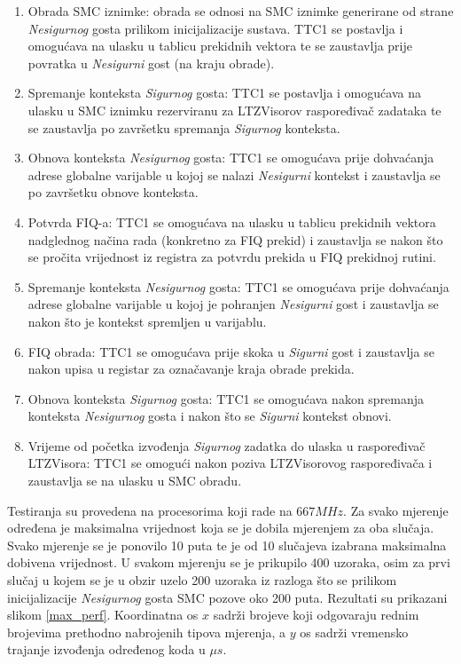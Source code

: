 \documentclass[times, utf8, diplomski, numeric]{fer}
\begin{document}
\begin{enumerate}
  \item{Obrada SMC iznimke: obrada se odnosi na SMC iznimke generirane od strane \textit{Nesigurnog} gosta prilikom
  inicijalizacije sustava. TTC1 se postavlja i omogućava na ulasku u tablicu prekidnih vektora te se zaustavlja prije
  povratka u \textit{Nesigurni} gost (na kraju obrade).}
  \item{Spremanje konteksta \textit{Sigurnog} gosta: TTC1 se postavlja i omogućava na ulasku u SMC iznimku rezerviranu
  za LTZVisorov raspoređivač zadataka te se zaustavlja po završetku spremanja \textit{Sigurnog} konteksta.}
  \item{Obnova konteksta \textit{Nesigurnog} gosta: TTC1 se omogućava prije dohvaćanja adrese globalne varijable u kojoj
  se nalazi \textit{Nesigurni} kontekst i zaustavlja se po završetku obnove konteksta.}
  \item{Potvrda FIQ-a: TTC1 se omogućava na ulasku u tablicu prekidnih vektora nadglednog načina rada (konkretno za
  FIQ prekid) i zaustavlja se nakon što se pročita vrijednost iz registra za potvrdu prekida u FIQ prekidnoj rutini.}
  \item{Spremanje konteksta \textit{Nesigurnog} gosta: TTC1 se omogućava prije dohvaćanja adrese globalne varijable u kojoj
  je pohranjen \textit{Nesigurni} gost i zaustavlja se nakon što je kontekst spremljen u varijablu.}
  \item{FIQ obrada: TTC1 se omogućava prije skoka u \textit{Sigurni} gost i zaustavlja se nakon upisa u registar za
  označavanje kraja obrade prekida.}
  \item{Obnova konteksta \textit{Sigurnog} gosta: TTC1 se omogućava nakon spremanja konteksta \textit{Nesigurnog} gosta
  i nakon što se \textit{Sigurni} kontekst obnovi.}
  \item{Vrijeme od početka izvođenja \textit{Sigurnog} zadatka do ulaska u raspoređivač LTZVisora: TTC1 se omogući
  nakon poziva LTZVisorovog raspoređivača i zaustavlja se na ulasku u SMC obradu.}
\end{enumerate}
Testiranja su provedena na procesorima koji rade na $667 MHz$. Za svako mjerenje određena je maksimalna vrijednost
koja se je dobila mjerenjem za oba slučaja. Svako mjerenje se je ponovilo 10 puta te je od 10 slučajeva izabrana
maksimalna dobivena vrijednost. U svakom mjerenju se je prikupilo 400 uzoraka, osim za prvi slučaj u kojem se je u
obzir uzelo 200 uzoraka iz razloga što se prilikom inicijalizacije \textit{Nesigurnog} gosta SMC pozove oko 200 puta.
Rezultati su prikazani slikom \ref{max_perf}. Koordinatna
os $x$ sadrži brojeve koji odgovaraju rednim brojevima prethodno nabrojenih tipova mjerenja, a $y$ os sadrži vremensko
trajanje izvođenja određenog koda u $\mu s$.
\end{document}
